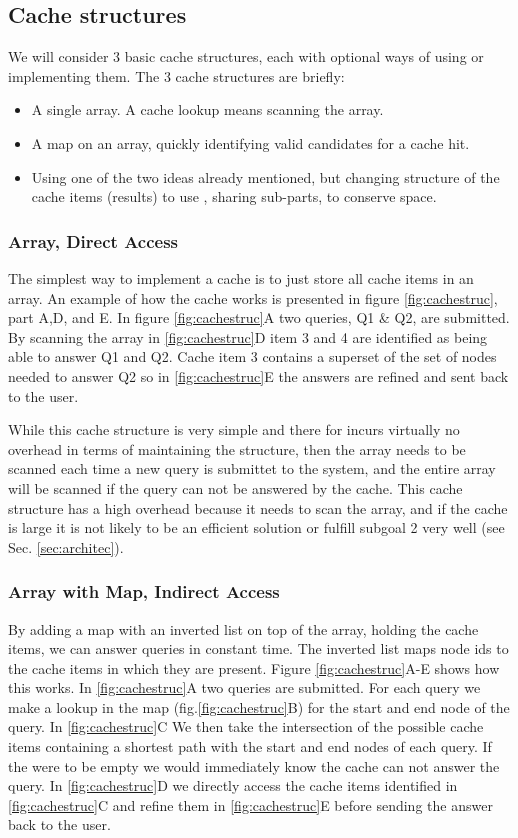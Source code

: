 \subsection{Cache structures}

We will consider 3 basic cache structures, each with optional ways of using or implementing them. The 3 cache structures are briefly:
\begin{itemize}
\item A single array. A cache lookup means scanning the array.
\item A map on an array, quickly identifying valid candidates for a cache hit.
\item Using one of the two ideas already mentioned, but changing structure of the cache items (\spath results) to use \spsns, sharing sub-parts, to conserve space.
\end{itemize}

\subsubsection{Array, Direct Access}

The simplest way to implement a cache is to just store all cache items in an array. An example of how the cache works is presented in  figure \ref{fig:cachestruc}, part A,D, and E. In figure \ref{fig:cachestruc}A two \spath queries, Q1 \& Q2, are submitted. By scanning the array in \ref{fig:cachestruc}D item 3 and 4 are identified as being able to answer Q1 and Q2. Cache item 3 contains a superset of the set of nodes needed to answer Q2 so in \ref{fig:cachestruc}E the answers are refined and sent back to the user.

While this cache structure is very simple and there for incurs virtually no overhead in terms of maintaining the structure, then the array needs to be scanned each time a new query is submittet to the system, and the entire array will be scanned if the query can not be answered by the cache. This cache structure has a high overhead because it needs to scan the array, and if the cache is large it is not likely to be an efficient solution or fulfill subgoal 2 very well (see Sec. \ref{sec:architec}).


\subsubsection{Array with Map, Indirect Access}
By adding a map with an inverted list on top of the array, holding the cache items, we can answer queries in constant time. The inverted list maps node ids to the cache items in which they are present. Figure \ref{fig:cachestruc}A-E shows how this works. In \ref{fig:cachestruc}A two queries are submitted. For each query we make a lookup in the map (fig.\ref{fig:cachestruc}B) for the start and end node of the query. In \ref{fig:cachestruc}C We then take the intersection of the possible cache items containing a shortest path with the start and end nodes of each query. If the were to be empty we would immediately know the cache can not answer the query. In \ref{fig:cachestruc}D we directly access the cache items identified in \ref{fig:cachestruc}C and refine them in \ref{fig:cachestruc}E before sending the answer back to the user.

